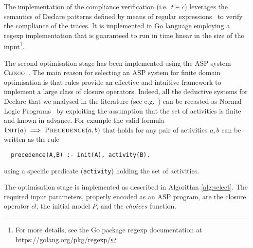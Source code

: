 The implementation of the compliance verification  (i.e.\ $t\models c$) leverages the semantics of Declare patterns defined by means of regular expressions \cite{2017-DiCiccio}%
~to verify the compliance of the traces. It is implemented in Go language employing a regexp implementation that is guaranteed to run in time linear in the size of the input\footnote{For more details, see the Go package regexp documentation at https://golang.org/pkg/regexp/}.
\lstset{language=Prolog}

The second optimisation stage has been implemented using the \ac{ASP} system \textsc{Clingo}~\cite{DBLP:journals/corr/GebserKKS14}. The main reason for selecting an \ac{ASP} system for finite domain optimisation is that rules provide an effective and intuitive framework to implement a large class of closure operators. Indeed, all the deductive systems for Declare that we analysed in the literature (see e.g.~\cite{2016-Bernardi,2017-DiCiccio}) can be recasted as Normal Logic Programs~\cite{2008-Lifschitz} by exploiting the assumption that the set of activities is finite and known in advance.
%
For example the valid formula $\textsc{Init}(a)\implies\textsc{Precedence}(a,b)$ that holds for any pair of activities $a, b$ can be written as the rule
\begin{lstlisting}
  precedence(A,B) :- init(A), activity(B).
\end{lstlisting}
using a specific predicate (\lstinline{activity}) holding the set of activities.

The optimisation stage is implemented as described in Algorithm \ref{alg:select}. The required input parameters, properly encoded as an \ac{ASP} program, are the closure operator $cl$, the initial model $P$, and the $choices$ function.



